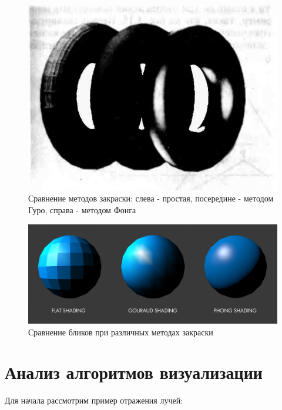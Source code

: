 \documentclass[a4paper,14pt,unknownkeysallowed]{extreport}
\begin{document}
\begin{figure}[H]
	\centering
	\includegraphics{shading_compare}
	\caption{Сравнение методов закраски: слева - простая, посередине - методом Гуро, справа - методом Фонга}
	\label{fig:shading_compare}
\end{figure}

\begin{figure}[H]
	\centering
	\includegraphics[scale=0.3]{reflexion_shading_compare}
	\caption{Сравнение бликов при различных методах закраски}
	\label{fig:reflexion_shading_compare}
\end{figure}






\section[Анализ алгоритмов создания отражений]{Анализ алгоритмов визуализации}

Для начала рассмотрим пример отражения лучей:
\end{document}
